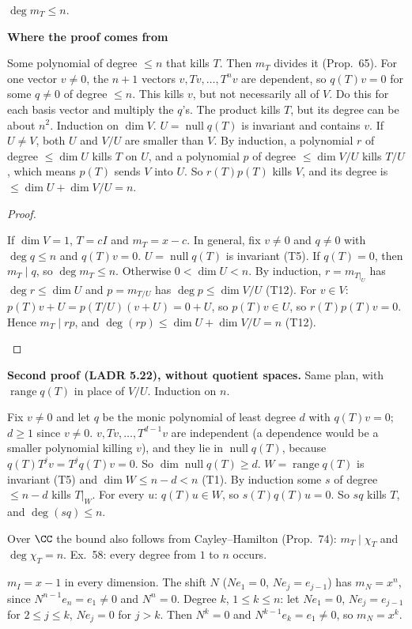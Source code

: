 \documentclass[10pt]{scrartcl}
\DeclareMathOperator{\nul}{null}
\DeclareMathOperator{\range}{range}
\newenvironment{motive}{\begin{mdframed}[style=thinkbox]\textbf{\color{OliveGreen!75!black}Where the proof comes from}\begin{description}[leftmargin=0.9em,labelindent=0pt,itemsep=2pt,topsep=2pt,font=\normalfont\bfseries\color{OliveGreen!70!black}]}{\end{description}\end{mdframed}}
\newenvironment{steps}{\begin{enumerate}[label=\arabic*.,leftmargin=1.5em,itemsep=2pt,topsep=2pt]}{\end{enumerate}}
\begin{document}
\begin{proposition*}
  $\deg m_T\le n$.
\end{proposition*}
\begin{motive}
  \ii[Want.] Some polynomial of degree $\le n$ that kills $T$. Then $m_T$ divides it (Prop.~65).
  \ii[Know.] For one vector $v\ne0$, the $n+1$ vectors $v,Tv,\dots,T^nv$ are dependent, so $q(T)v=0$ for some $q\ne0$ of degree $\le n$. This kills $v$, but not necessarily all of $V$.
   Do this for each basis vector and multiply the $q$'s. The product kills $T$, but its degree can be about $n^2$.
   Induction on $\dim V$. $U=\nul q(T)$ is invariant and contains $v$. If $U\ne V$, both $U$ and $V/U$ are smaller than $V$. By induction, a polynomial $r$ of degree $\le\dim U$ kills $T$ on $U$, and a polynomial $p$ of degree $\le\dim V/U$ kills $T/U$, which means $p(T)$ sends $V$ into $U$. So $r(T)p(T)$ kills $V$, and its degree is $\le\dim U+\dim V/U=n$.
\end{motive}
\begin{proof}
  \begin{steps}
    \ii If $\dim V=1$, $T=cI$ and $m_T=x-c$. In general, fix $v\ne0$ and $q\ne0$ with $\deg q\le n$ and $q(T)v=0$. $U=\nul q(T)$ is invariant (T5).
    \ii If $q(T)=0$, then $m_T\mid q$, so $\deg m_T\le n$.
    \ii Otherwise $0<\dim U<n$. By induction, $r=m_{T|_U}$ has $\deg r\le\dim U$ and $p=m_{T/U}$ has $\deg p\le\dim V/U$ (T12).
    \ii For $v\in V$: $p(T)v+U=p(T/U)(v+U)=0+U$, so $p(T)v\in U$, so $r(T)p(T)v=0$. Hence $m_T\mid rp$, and $\deg(rp)\le\dim U+\dim V/U=n$ (T12).
  \end{steps}
\end{proof}
\textbf{Second proof (LADR 5.22), without quotient spaces.} Same plan, with $\range q(T)$ in place of $V/U$. Induction on $n$.
\begin{steps}
  \ii Fix $v\ne0$ and let $q$ be the monic polynomial of least degree $d$ with $q(T)v=0$; $d\ge1$ since $v\ne0$.
  \ii $v,Tv,\dots,T^{d-1}v$ are independent (a dependence would be a smaller polynomial killing $v$), and they lie in $\nul q(T)$, because $q(T)T^jv=T^jq(T)v=0$. So $\dim\nul q(T)\ge d$.
  \ii $W=\range q(T)$ is invariant (T5) and $\dim W\le n-d<n$ (T1). By induction some $s$ of degree $\le n-d$ kills $T|_W$.
  \ii For every $u$: $q(T)u\in W$, so $s(T)q(T)u=0$. So $sq$ kills $T$, and $\deg(sq)\le n$.
\end{steps}
\begin{itemize}
  \ii Over $\CC$ the bound also follows from Cayley--Hamilton (Prop.~74): $m_T\mid\chi_T$ and $\deg\chi_T=n$.
  \ii Ex.~58: every degree from $1$ to $n$ occurs.
  \begin{itemize}
    \ii $m_I=x-1$ in every dimension.
    \ii The shift $N$ ($Ne_1=0$, $Ne_j=e_{j-1}$) has $m_N=x^n$, since $N^{n-1}e_n=e_1\ne0$ and $N^n=0$.
    \ii Degree $k$, $1\le k\le n$: let $Ne_1=0$, $Ne_j=e_{j-1}$ for $2\le j\le k$, $Ne_j=0$ for $j>k$. Then $N^k=0$ and $N^{k-1}e_k=e_1\ne0$, so $m_N=x^k$.
  \end{itemize}
\end{itemize}
\end{document}
